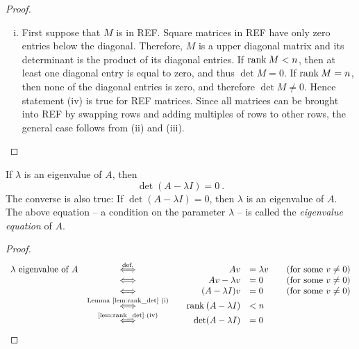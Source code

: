 \begin{proof}
\begin{enumerate}[(i)]
\begin{itemize}
	\end{itemize}
	\item First suppose that $M$ is in REF. Square matrices in REF have only zero entries below the diagonal. Therefore, $M$ is a upper diagonal matrix and its determinant is the product of its diagonal entries. If $\text{rank}\: M < n$, then at least one diagonal entry is equal to zero, and thus $\det M = 0$. If $\text{rank}\: M = n$, then none of the diagonal entries is zero, and therefore $\det M \not= 0$. Hence statement (iv) is true for REF matrices. Since all matrices can be brought into REF by swapping rows and adding multiples of rows to other rows, the general case follows from (ii) and (iii).
\end{enumerate}
\end{proof}

\begin{theorem}
\label{thm:eigenvalues}	
	If $\lambda$ is an eigenvalue of $A$, then
	\[ \det(A - \lambda I) = 0 \:. \]
	The converse is also true: If $\det(A - \lambda I) = 0$, then $\lambda$ is an eigenvalue of $A$. The above equation -- a condition on the parameter $\lambda$ -- is called the \emph{eigenvalue equation} of $A$.
\end{theorem}
\begin{proof}
	\[ \begin{array}{cccrlcc}
	\lambda \text{~eigenvalue of~}A &\stackrel{\text{def.}}{\Longleftrightarrow} & & Av & = \lambda v & & (\text{for some~}v\not=0) \\	
	&\Longleftrightarrow & & Av - \lambda v & = 0 & & (\text{for some~}v\not=0) \\	
	&\Longleftrightarrow & & (A - \lambda I)v & = 0 & & (\text{for some~}v\not=0) \\
	&\stackrel{\text{Lemma~\ref{lem:rank_det} (i)}}{\Longleftrightarrow} & & \text{rank}\: (A - \lambda I) & < n & & \\	
	&\stackrel{\text{\ref{lem:rank_det} (iv)}}{\Longleftrightarrow} & & \det(A - \lambda I) & = 0 & & 
	\end{array} \]
\end{proof}

